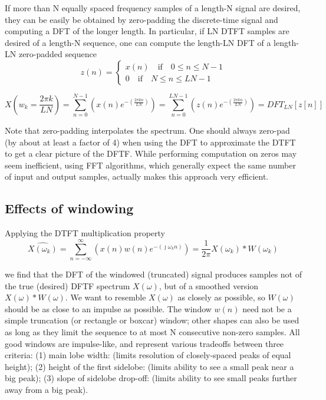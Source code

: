 \documentclass[10pt,english]{article}
\begin{document}
If more than N equally spaced frequency samples of a length-N signal are desired, they can be easily be obtained by zero-padding the discrete-time signal and computing a DFT of the longer length. In particular, if LN DTFT samples are desired of a length-N sequence, one can compute the length-LN DFT of a length-LN zero-padded sequence 
\begin{equation}
z(n) = \begin{cases}
x(n) \quad \mbox{if} \quad 0 \leq n \leq N-1 \\
0 \quad \mbox{if} \quad  N \leq n \leq LN-1
\end{cases}
\end{equation} 

\begin{equation}
X \left( w_k = \frac{2 \pi k}{LN} \right) = \sum_{n = 0}^{N-1 } \left( x(n) e^{-\left( \frac{2 \pi k n}{LN} \right)}  \right)=  \sum_{n = 0}^{LN-1 } \left( z(n) e^{-\left( \frac{2 \pi k n}{LN} \right)}  \right) = DFT_{LN} \left[ z \left[ n \right] \right]
\end{equation}

Note that zero-padding interpolates the spectrum. One should always zero-pad (by about at least a factor of 4) when using the DFT to approximate the DTFT to get a clear picture of the DFTF. While performing computation on zeros may seem inefficient, using FFT algorithms, which generally expect the same number of input and output samples, actually makes this approach very efficient.\\

\subsection{Effects of windowing}

Applying the DTFT multiplication property 
\begin{equation}
\hat{X \left( \omega_k \right)} = \sum_{n = - \infty }^{ \infty} \left( x(n) w(n) e^{- \left( \jmath \omega_k n \right)} \right) = \frac{1}{2 \pi} X \left( \omega_k \right) * W \left( \omega_k \right)
\end{equation}

we find that the DFT of the windowed (truncated) signal produces samples not of the true (desired) DFTF spectrum $X(\omega)$, but of a smoothed version $X \left( \omega \right) * W \left( \omega \right)$. We want to resemble $X(\omega)$ as closely as possible, so $W( \omega)$ should be as close to an impulse as possible. The window $w(n)$ need not be a simple truncation (or rectangle or boxcar) window; other shapes can also be used as long as they limit the sequence to at most N consecutive non-zero samples. All good windows are impulse-like, and represent various tradeoffs between three criteria: (1) main lobe width: (limits resolution of closely-spaced peaks of equal height); (2) height of the first sidelobe: (limits ability to see a small peak near a big peak); (3) slope of sidelobe drop-off: (limits ability to see small peaks further away from a big peak). \\
\end{document}
